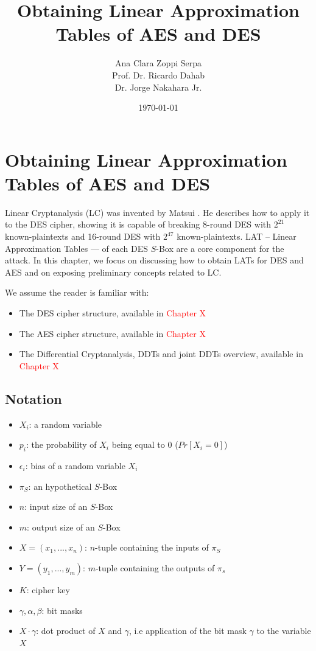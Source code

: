 \documentclass{report}
\title{Obtaining Linear Approximation Tables of AES and DES}
\author{Ana Clara Zoppi Serpa\\ Prof. Dr. Ricardo Dahab \\ Dr. Jorge Nakahara Jr.}
\date{\today}
\begin{document}
\maketitle

\tableofcontents

\chapter{Obtaining Linear Approximation Tables of AES and DES}

Linear Cryptanalysis (LC) was invented by Matsui \cite{Matsui1993LinearCM}. He describes how to apply it to the DES \cite{DES-FIPS} cipher, showing it is capable of breaking 8-round DES with $2^{21}$ known-plaintexts and 16-round DES with $2^{47}$ known-plaintexts. LAT -- Linear Approximation Tables --- of each DES $S$-Box are a core component for the attack. In this chapter, we focus on discussing how to obtain LATs for DES and AES \cite{AES-FIPS} and on exposing preliminary concepts related to LC.

We assume the reader is familiar with:
\begin{itemize}
    \item The DES cipher structure, available in \textcolor{red}{Chapter X}
    \item The AES cipher structure, available in \textcolor{red}{Chapter X}
    \item The Differential Cryptanalysis, DDTs and joint DDTs overview, available in \textcolor{red}{Chapter X}
\end{itemize}

\section{Notation}
\begin{itemize}
    \item $X_i$: a random variable
    \item $p_i$: the probability of $X_i$ being equal to $0$ ($Pr[X_i = 0]$)
    \item $\epsilon_i$: bias of a random variable $X_i$
    \item $\pi_S$: an hypothetical $S$-Box
    \item $n$: input size of an $S$-Box
    \item $m$: output size of an $S$-Box
    \item $X = (x_1, ..., x_n)$: $n$-tuple containing the inputs of $\pi_S$
    \item $Y = (y_1, ..., y_m)$: $m$-tuple containing the outputs of $\pi_s$
    \item $K$: cipher key
    \item $\gamma, \alpha, \beta$: bit masks
    \item $X \cdot \gamma$: dot product of $X$ and $\gamma$, i.e application of the bit mask $\gamma$ to the variable $X$
\end{itemize}
\end{document}
